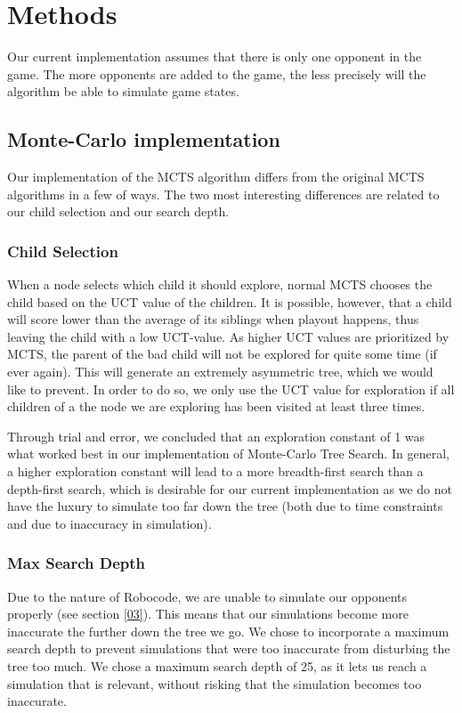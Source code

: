 \section{Methods}
\label{04}
Our current implementation assumes that there is only one opponent in the game. The more opponents are added to the game, the less precisely will the algorithm be able to simulate game states.

\subsection{Monte-Carlo implementation}
\label{04_MCTS}

Our implementation of the MCTS algorithm differs from the original MCTS algorithms in a few of ways. The two most interesting differences are related to our child selection and our search depth.

\subsubsection{Child Selection}
When a node selects which child it should explore, normal MCTS chooses the child based on the UCT\cite{kocsis2006bandit} value of the children. It is possible, however, that a child will score lower than the average of its siblings when playout happens, thus leaving the child with a low UCT-value. As higher UCT values are prioritized by MCTS, the parent of the bad child will not be explored for quite some time (if ever again). This will generate an extremely asymmetric tree, which we would like to prevent. In order to do so, we only use the UCT value for exploration if all children of a the node we are exploring has been visited at least three times.

Through trial and error, we concluded that an exploration constant of 1 was what worked best in our implementation of Monte-Carlo Tree Search. In general, a higher exploration constant will lead to a more breadth-first search than a depth-first search, which is desirable for our current implementation as we do not have the luxury to simulate too far down the tree (both due to time constraints and due to inaccuracy in simulation).

\subsubsection{Max Search Depth}
Due to the nature of Robocode, we are unable to simulate our opponents properly (see section \ref{03}). This means that our simulations become more inaccurate the further down the tree we go. We chose to incorporate a maximum search depth to prevent simulations that were too inaccurate from disturbing the tree too much. We chose a maximum search depth of 25, as it lets us reach a simulation that is relevant, without risking that the simulation becomes too inaccurate.

